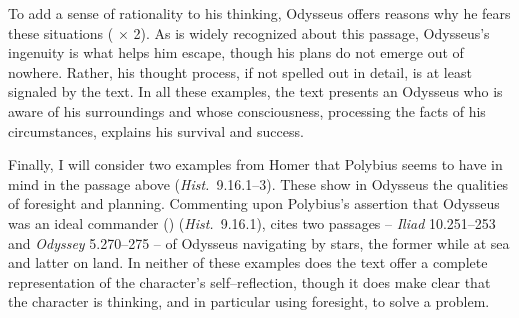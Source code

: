 \documentclass[12pt,letterpaper,oneside,final]{memoir}
\begin{document}
To add a sense of rationality to his thinking, Odysseus offers reasons why he fears these situations ( $\times$ 2). As is widely recognized about this passage, Odysseus's ingenuity is what helps him escape, though his plans do not emerge out of nowhere. Rather, his thought process, if not spelled out in detail, is at least signaled by the text. In all these examples, the text presents an Odysseus who is aware of his surroundings and whose consciousness, processing the facts of his circumstances, explains his survival and success.

Finally, I will consider two examples from Homer that Polybius seems to have in mind in the passage above  (\emph{Hist.}~9.16.1--3). These show in Odysseus the qualities of foresight and planning. Commenting upon Polybius's assertion that Odysseus was an ideal commander () (\emph{Hist.}~9.16.1), \textcite[142]{walbank1967} cites two passages -- \emph{Iliad} 10.251--253 and \emph{Odyssey} 5.270--275 -- of Odysseus navigating by stars, the former while at sea and latter on land. In neither of these examples does the text offer a complete representation of the character's self--reflection, though it does make clear that the character is thinking, and in particular using foresight, to solve a problem. 
\end{document}
